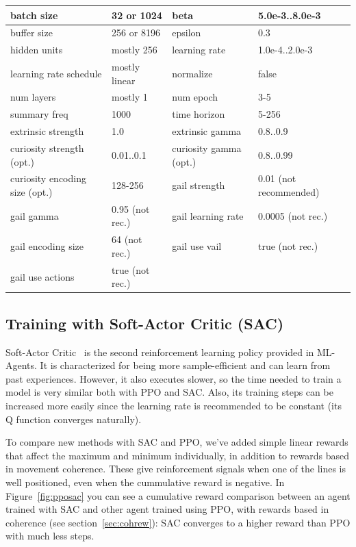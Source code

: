 \begin{center}
	\begin{tabular}{ | m{4cm} | m{2.5cm}||m{4cm} | m{2.5cm} | } 
		\hline
			batch size & 32 or 1024 & beta & 5.0e-3..8.0e-3\\ 
		\hline
			buffer size & 256 or 8196 & epsilon & 0.3\\
		\hline
			hidden units & mostly 256 & learning rate & 1.0e-4..2.0e-3\\
		\hline
			learning rate schedule & mostly linear & normalize & false\\
		\hline
			num layers & mostly 1 & num epoch & 3-5\\
		\hline
			summary freq & 1000 & time horizon & 5-256\\
		\hline
			extrinsic strength & 1.0 & extrinsic gamma & 0.8..0.9\\
		\hline
			curiosity strength (opt.) & 0.01..0.1 & curiosity gamma (opt.) & 0.8..0.99\\
		\hline
			curiosity encoding size (opt.) & 128-256 & gail strength & 0.01 (not recommended)\\
		\hline
			gail gamma & 0.95 (not rec.) & gail learning rate & 0.0005 (not rec.)\\
		\hline
			gail encoding size & 64 (not rec.) & gail use vail & true (not rec.)\\
		\hline
			gail use actions & true (not rec.) & & \\
		\hline
	\end{tabular}
\end{center}

\subsection{Training with Soft-Actor Critic (SAC)}
\label{sec:trainingSAC}

Soft-Actor Critic~\cite{sacpolicy} is the second reinforcement learning policy provided in ML-Agents. It is characterized for being more sample-efficient and can learn from past experiences. However, it also executes slower, so the time needed to train a model is very similar both with PPO and SAC. Also, its training steps can be increased more easily since the learning rate is recommended to be constant (its Q function converges naturally).

To compare new methods with SAC and PPO, we've added simple linear rewards that affect the maximum and minimum individually, in addition to rewards based in movement coherence. These give reinforcement signals when one of the lines is well positioned, even when the cummulative reward is negative. In Figure~\ref{fig:pposac} you can see a cumulative reward comparison between an agent trained with SAC and other agent trained using PPO, with rewards based in coherence (see section~\ref{sec:cohrew}): SAC converges to a higher reward than PPO with much less steps.

